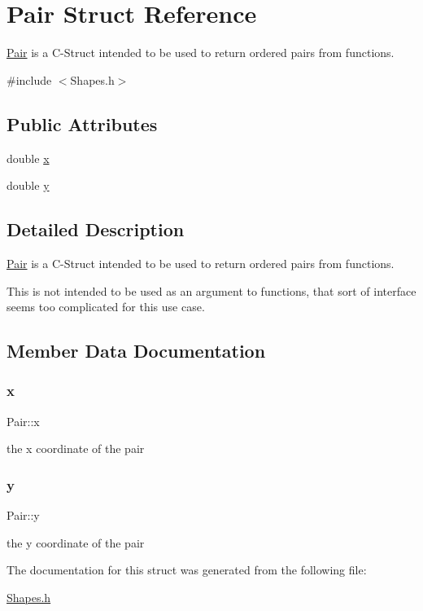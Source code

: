 \hypertarget{structPair}{}\section{Pair Struct Reference}
\label{structPair}


\hyperlink{structPair}{Pair} is a C-\/\+Struct intended to be used to return ordered pairs from functions.  




{\ttfamily \#include $<$Shapes.\+h$>$}

\subsection*{Public Attributes}
\begin{DoxyCompactItemize}
\item 
double \hyperlink{structPair_acb8b900ed7f28f63ece97bb0c09fc2f8}{x}
\item 
double \hyperlink{structPair_a5d0914aa71dd7a1cdd9d3ff9c7308e5f}{y}
\end{DoxyCompactItemize}


\subsection{Detailed Description}
\hyperlink{structPair}{Pair} is a C-\/\+Struct intended to be used to return ordered pairs from functions. 

This is not intended to be used as an argument to functions, that sort of interface seems too complicated for this use case. 

\subsection{Member Data Documentation}
\mbox{\label{structPair_acb8b900ed7f28f63ece97bb0c09fc2f8}} 
\subsubsection{\texorpdfstring{x}{x}}
{\footnotesize\ttfamily Pair\+::x}

the x coordinate of the pair \mbox{\label{structPair_a5d0914aa71dd7a1cdd9d3ff9c7308e5f}} 
\subsubsection{\texorpdfstring{y}{y}}
{\footnotesize\ttfamily Pair\+::y}

the y coordinate of the pair 

The documentation for this struct was generated from the following file\+:\begin{DoxyCompactItemize}
\item 
\hyperlink{Shapes_8h}{Shapes.\+h}\end{DoxyCompactItemize}
